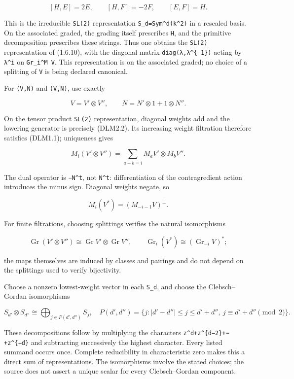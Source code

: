 \documentclass[
]{report}
\begin{document}
\[
[H,E]=2E,\qquad[H,F]=-2F,\qquad[E,F]=H.
\]

This is the irreducible \texttt{SL(2)} representation
\texttt{S\_d=Sym\^{}d(k\^{}2)} in a rescaled basis. On the associated
graded, the grading itself prescribes \texttt{H}, and the primitive
decomposition prescribes these strings. Thus one obtains the
\texttt{SL(2)} representation of (1.6.10), with the diagonal matrix
\texttt{diag(λ,λ\^{}\{-1\})} acting by \texttt{λ\^{}i} on
\texttt{Gr\_i\^{}M\ V}. This representation is on the associated graded;
no choice of a splitting of \texttt{V} is being declared canonical.

For \texttt{(V\textquotesingle{},N\textquotesingle{})} and
\texttt{(V\textquotesingle{}\textquotesingle{},N\textquotesingle{}\textquotesingle{})},
use exactly

\[
V=V'\otimes V'',\qquad N=N'\otimes1+1\otimes N''.
\tag{DLM2.2}
\]

On the tensor product \texttt{SL(2)} representation, diagonal weights
add and the lowering generator is precisely (DLM2.2). Its increasing
weight filtration therefore satisfies (DLM1.1); uniqueness gives

\[
M_i(V'\otimes V'')=\sum_{a+b=i}M_aV'\otimes M_bV''.
\tag{DLM2.3}
\]

The dual operator is \texttt{−N\^{}t}, not \texttt{N\^{}t}:
differentiation of the contragredient action introduces the minus sign.
Diagonal weights negate, so

\[
M_i(V^*)=(M_{-i-1}V)^\perp.
\tag{DLM2.4}
\]

For finite filtrations, choosing splittings verifies the natural
isomorphisms

\[
\operatorname{Gr}(V'\otimes V'')\cong\operatorname{Gr}V'\otimes\operatorname{Gr}V'',
\qquad
\operatorname{Gr}_i(V^*)\cong(\operatorname{Gr}_{-i}V)^*;
\]

the maps themselves are induced by classes and pairings and do not
depend on the splittings used to verify bijectivity.

Choose a nonzero lowest-weight vector in each \texttt{S\_d}, and choose
the Clebsch--Gordan isomorphisms

\[
S_{d'}\otimes S_{d''}\cong
\bigoplus_{j\in P(d',d'')}S_j,
\quad
P(d',d'')=\{j:|d'-d''|\le j\le d'+d'',\ j\equiv d'+d''\pmod2\}.
\tag{DLM2.5}
\]

These decompositions follow by multiplying the characters
\texttt{z\^{}d+z\^{}\{d−2\}+⋯+z\^{}\{−d\}} and subtracting successively
the highest character. Every listed summand occurs once. Complete
reducibility in characteristic zero makes this a direct sum of
representations. The isomorphisms involve the stated choices; the source
does not assert a unique scalar for every Clebsch--Gordan component.
\end{document}
